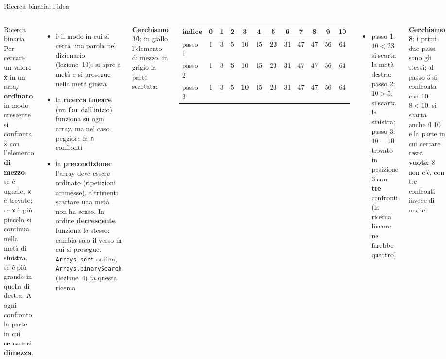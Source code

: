 \documentclass[10pt,aspectratio=169,xcolor={table}]{beamer}
\newcommand{\gr}[1]{\textcolor{gray!60}{#1}}
\newcommand{\md}[1]{\cellcolor{yellow!55}\textbf{#1}}
\newcommand{\ok}[1]{\cellcolor{green!40}\textbf{#1}}
\begin{document}
\begin{frame}[fragile]{Ricerca binaria: l'idea}
\begin{columns}[T]
\begin{block}{Ricerca binaria}
\small Per cercare un valore \texttt{x} in un array \textbf{ordinato} in modo crescente si confronta \texttt{x} con l'elemento \textbf{di mezzo}: se è uguale, \texttt{x} è trovato; se \texttt{x} è più piccolo si continua nella metà di sinistra, se è più grande in quella di destra. A ogni confronto la parte in cui cercare si \textbf{dimezza}.
\end{block}
\footnotesize
\begin{itemize}\itemsep=3pt
    \item è il modo in cui si cerca una parola nel dizionario (lezione~10): si apre a metà e si prosegue nella metà giusta
    \item la \textbf{ricerca lineare} (un \texttt{for} dall'inizio) funziona su ogni array, ma nel caso peggiore fa \texttt{n} confronti
    \item la \textbf{precondizione}: l'array deve essere ordinato (ripetizioni ammesse), altrimenti scartare una metà non ha senso. In ordine \textbf{decrescente} funziona lo stesso: cambia solo il verso in cui si prosegue. \texttt{Arrays.sort} ordina, \texttt{Arrays.binarySearch} (lezione~4) fa questa ricerca
\end{itemize}

\footnotesize
\textbf{Cerchiamo 10}: in giallo l'elemento di mezzo, in grigio la parte scartata:
\begin{center}
\footnotesize\setlength{\tabcolsep}{2.4pt}\renewcommand{\arraystretch}{1.2}
\begin{tabular}{l|ccccccccccc}
indice & 0 & 1 & 2 & 3 & 4 & 5 & 6 & 7 & 8 & 9 & 10 \\
\hline
passo 1 & 1 & 3 & 5 & 10 & 15 & \md{23} & 31 & 47 & 47 & 56 & 64 \\
passo 2 & 1 & 3 & \md{5} & 10 & 15 & \gr{23} & \gr{31} & \gr{47} & \gr{47} & \gr{56} & \gr{64} \\
passo 3 & \gr{1} & \gr{3} & \gr{5} & \ok{10} & 15 & \gr{23} & \gr{31} & \gr{47} & \gr{47} & \gr{56} & \gr{64} \\
\end{tabular}
\end{center}
\begin{itemize}\itemsep=2pt
    \item passo 1: $10 < 23$, si scarta la metà destra; passo 2: $10 > 5$, si scarta la sinistra; passo 3: $10 = 10$, trovato in posizione 3 con \textbf{tre} confronti (la ricerca lineare ne farebbe quattro)
\end{itemize}
\textbf{Cerchiamo 8}: i primi due passi sono gli stessi; al passo 3 si confronta con 10: $8 < 10$, si scarta anche il 10 e la parte in cui cercare resta \textbf{vuota}: 8 non c'è, con tre confronti invece di undici
\end{columns}
\end{frame}
\end{document}

